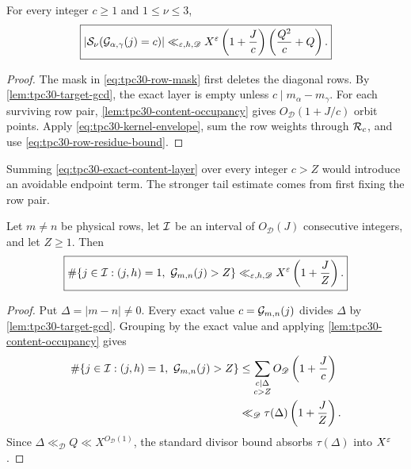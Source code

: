 \begin{proposition}
\label{prop:tpc30-exact-content-layer}
For every integer $c\ge1$ and $1\le\nu\le3$,
\begin{equation}
 \boxed{
 |\mathcal S_\nu(\mathcal G_{\alpha,\gamma}(j)=c)|
 \ll_{\varepsilon,h,\mathscr D}X^\varepsilon
 \left(1+\frac Jc\right)
 \left(\frac{Q^2}{c}+Q\right).}
 \label{eq:tpc30-exact-content-layer}
\end{equation}
\end{proposition}

\begin{proof}
The mask in \eqref{eq:tpc30-row-mask} first deletes the diagonal rows.
By \cref{lem:tpc30-target-gcd}, the exact layer is empty unless
$c\mid m_\alpha-m_\gamma$.  For each surviving row pair,
\cref{lem:tpc30-content-occupancy} gives
$O_{\mathscr D}(1+J/c)$ orbit points.  Apply
\eqref{eq:tpc30-kernel-envelope}, sum the row weights through
$\mathcal R_c$, and use \eqref{eq:tpc30-row-residue-bound}.
\end{proof}

Summing \eqref{eq:tpc30-exact-content-layer} over every integer
$c>Z$ would introduce an avoidable endpoint term.  The stronger
tail estimate comes from first fixing the row pair.

\begin{lemma}
\label{lem:tpc30-fixed-row-large-content}
Let $m\ne n$ be physical rows, let $\mathcal I$ be an interval of
$O_{\mathscr D}(J)$ consecutive integers, and let $Z\ge1$.  Then
\begin{equation}
 \boxed{
 \#\{j\in\mathcal I:(j,h)=1,\ \mathcal G_{m,n}(j)>Z\}
 \ll_{\varepsilon,h,\mathscr D}
 X^\varepsilon\left(1+\frac JZ\right).}
 \label{eq:tpc30-fixed-row-large-content}
\end{equation}
\end{lemma}

\begin{proof}
Put $\Delta=|m-n|\ne0$.  Every exact value
$c=\mathcal G_{m,n}(j)$ divides $\Delta$ by
\cref{lem:tpc30-target-gcd}.  Grouping by the exact value and applying
\cref{lem:tpc30-content-occupancy} gives
\begin{align}
 \#\{j\in\mathcal I:(j,h)=1,\ \mathcal G_{m,n}(j)>Z\}
 &\le
 \sum_{\substack{c\mid\Delta\\c>Z}}
 O_{\mathscr D}\left(1+\frac Jc\right)
 \notag\\
 &\ll_{\mathscr D}
 \tau(\Delta)\left(1+\frac JZ\right).
 \label{eq:tpc30-fixed-row-divisor-sum}
\end{align}
Since $\Delta\ll_{\mathscr D}Q\ll X^{O_{\mathscr D}(1)}$, the standard
divisor bound absorbs $\tau(\Delta)$ into $X^\varepsilon$.
\end{proof}


